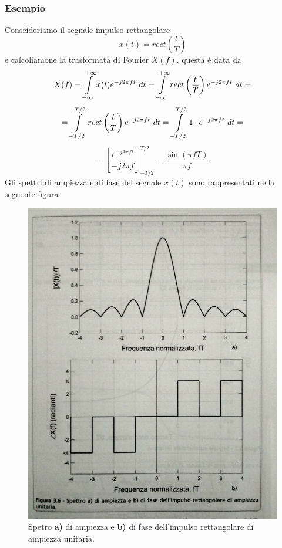 \documentclass[12pt,oneside,openany]{memoir}
\numberwithin{equation}{subsection}
\newcommand{\dt}{\ dt}
\begin{document}
\subsubsection{Esempio}
Conseideriamo il segnale impulso rettangolare
\[
	x(t) = rect\left(\frac{t}{T}\right)
\]
e calcoliamone la trasformata di Fourier $X(f)$. questa \`e data da
\[
	X(f) = \int\displaylimits_{-\infty}^{+\infty} x(t) e^{-j 2 \pi f t} \dt = \int\displaylimits_{-\infty}^{+\infty} rect\left(\frac{t}{T}\right) e^{-j 2 \pi f t} \dt =
\]
\[
	= \int\displaylimits_{-T/2}^{T/2} rect\left(\frac{t}{T}\right) e^{-j 2 \pi f t} \dt = \int\displaylimits_{-T/2}^{T/2} 1 \cdot e^{-j 2 \pi f t} \dt =
\]
\[
	= \left[\frac{e^{-j 2 \pi f t}}{-j 2 \pi f}\right]_{-T/2}^{T/2} = \frac{\sin(\pi f T)}{\pi f}.
\]
Gli spettri di ampiezza e di fase del segnale $x(t)$ sono rappresentati nella seguente figura
\begin{figure}[H]
\centering
\captionsetup{justification=centering}
\includegraphics[width=1.0\textwidth]{images/spettro_rect_alpha.jpg}
\caption{Spetro \textbf{a)} di ampiezza e \textbf{b)} di fase dell'impulso rettangolare di ampiezza unitaria.}
\end{figure}
\end{document}
